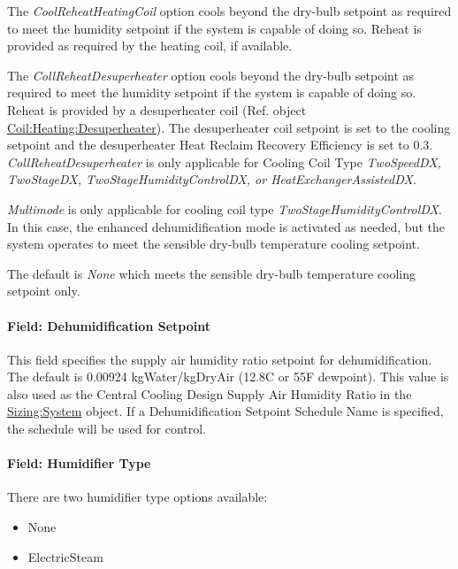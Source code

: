The \emph{CoolReheatHeatingCoil} option cools beyond the dry-bulb setpoint as required to meet the humidity setpoint if the system is capable of doing so. Reheat is provided as required by the heating coil, if available.

The \emph{CollReheatDesuperheater} option cools beyond the dry-bulb setpoint as required to meet the humidity setpoint if the system is capable of doing so. Reheat is provided by a desuperheater coil (Ref. object \hyperref[coilheatingdesuperheater]{Coil:Heating:Desuperheater}). The desuperheater coil setpoint is set to the cooling setpoint and the desuperheater Heat Reclaim Recovery Efficiency is set to 0.3. \emph{CollReheatDesuperheater} is only applicable for Cooling Coil Type \emph{TwoSpeedDX, TwoStageDX, TwoStageHumidityControlDX, or HeatExchangerAssistedDX.}

\emph{Multimode} is only applicable for cooling coil type \emph{TwoStageHumidityControlDX}. In this case, the enhanced dehumidification mode is activated as needed, but the system operates to meet the sensible dry-bulb temperature cooling setpoint.

The default is \emph{None} which meets the sensible dry-bulb temperature cooling setpoint only.

\paragraph{Field: Dehumidification Setpoint}\label{field-dehumidification-setpoint-4}

This field specifies the supply air humidity ratio setpoint for dehumidification. The default is 0.00924 kgWater/kgDryAir (12.8C or 55F dewpoint). This value is also used as the Central Cooling Design Supply Air Humidity Ratio in the \hyperref[sizingsystem]{Sizing:System} object. If a Dehumidification Setpoint Schedule Name is specified, the schedule will be used for control.

\paragraph{Field: Humidifier Type}\label{field-humidifier-type-7}

There are two humidifier type options available:

\begin{itemize}
\item
  None
\item
  ElectricSteam
\end{itemize}

